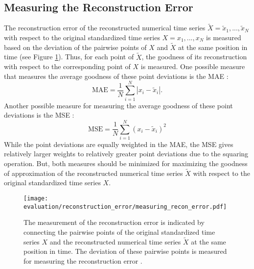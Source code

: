 \subsection*{Measuring the Reconstruction Error}
The reconstruction error of the reconstructed numerical time series $\tilde{X} = \tilde{x}_1, ..., \tilde{x}_N$ with respect to the original standardized time series $X = x_1, ..., x_N$ is measured based on the deviation of the pairwise points of $X$ and $\tilde{X}$ at the same position in time (see Figure \ref{fig:measuring_recon_error}). Thus, for each point of $\tilde{X}$, the goodness of its reconstruction with respect to the corresponding point of $X$ is measured. \newline
One possible measure that measures the average goodness of these point deviations is the \ac{MAE} \cite{Comparison_SAX}:
\begin{equation*}
\text{MAE} = \frac{1}{N} \sum_{i=1}^{N} |x_i - \tilde{x}_i|.
\label{eq:MAE}
\end{equation*}
Another possible measure for measuring the average goodness of these point deviations is the \ac{MSE} \cite{T_SAX}:
\begin{equation*}
\text{MSE} = \frac{1}{N} \sum_{i=1}^{N} (x_i - \tilde{x}_i)^2
\label{eq:MSE}
\end{equation*}
While the point deviations are equally weighted in the \ac{MAE}, the \ac{MSE} gives relatively larger weights to relatively greater point deviations due to the squaring operation. But, both measures should be minimized for maximizing the goodness of approximation of the reconstructed numerical time series $\tilde{X}$ with respect to the original standardized time series $X$.
\begin{figure}[htb]
\centering
\texttt{[image: evaluation/reconstruction\_error/measuring\_recon\_error.pdf]}
\caption[Reconstruction Error - Measuring the Reconstruction Error]{The measurement of the reconstruction error is indicated by connecting the pairwise points of the original standardized time series $X$ and the reconstructed numerical time series $\tilde{X}$ at the same position in time. The deviation of these pairwise points is measured for measuring the reconstruction error \cite{Comparison_SAX,T_SAX}.}
\label{fig:measuring_recon_error}
\end{figure}
